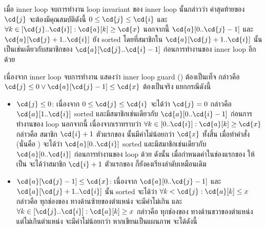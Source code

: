 \begin{example}
\begin{itemize}
เมื่อ inner loop จบการทำงาน loop invariant ของ inner loop นั้นกล่าวว่า ค่าสุดท้ายของ $\cd{j}$ จะต้องมีคุณสมบัติดังนี้ $0\leq\cd{j}\leq\cd{i}$ และ $\forall k\in[\cd{j}..\cd{i}]: \cd{a}[k]\geq\cd{x}$ \enskip นอกจากนี้ $\cd{a}[0..\cd{j}-1]$ และ $\cd{a}[\cd{j}+1..\cd{i}]$ ยัง sorted โดยที่สมาชิกใน $\cd{a}[\cd{j}+1..\cd{i}]$ นั้นเป็นเช่นเดียวกับสมาชิกของ $\cd{a}[\cd{j}..\cd{i}-1]$ ก่อนการทำงานของ inner loop อีกด้วย

เนื่องจาก inner loop จบการทำงาน แสดงว่า inner loop guard () ต้องเป็นเท็จ กล่าวคือ $\cd{j}\leq 0\vee\cd{a}[\cd{j}-1]\leq\cd{x}$ ต้องเป็นจริง \enskip แยกกรณีดังนี้
\begin{itemize}
\item $\cd{j}\leq 0$: เนื่องจาก $0\leq\cd{j}\leq\cd{i}$ จะได้ว่า $\cd{j}=0$ กล่าวคือ $\cd{a}[1..\cd{i}]$ sorted และมีสมาชิกเช่นเดียวกับ $\cd{a}[0..\cd{i}-1]$ ก่อนการทำงานของ loop \enskip นอกจากนี้ เนื่องจากเราทราบว่า $\forall k\in[0..\cd{i}]: \cd{a}[k]\geq\cd{x}$ กล่าวคือ สมาชิก $\cd{i}+1$ ตัวแรกของ  นั้นมีค่าไม่น้อยกว่า $\cd{x}$ ทั้งสิ้น เมื่อทำคำสั่ง  (นั่นคือ ) จะได้ว่า $\cd{a}[0..\cd{i}]$ sorted และมีสมาชิกเช่นเดียวกับ $\cd{a}[0..\cd{i}]$ ก่อนการทำงานของ loop ด้วย \enskip ดังนั้น เมื่อกำหนดค่าในช่องแรกของ  ให้เป็น  จะได้ว่าสมาชิก $\cd{i}+1$ ตัวแรกของ  ก็ยังคงเรียงลำดับเหมือนเดิม

\item $\cd{a}[\cd{j}-1]\leq\cd{x}$: เนื่องจาก $\cd{a}[0..\cd{j}-1]$ และ $\cd{a}[\cd{j}+1..\cd{i}]$ นั้น sorted จะได้ว่า $\forall k<\cd{j}: \cd{a}[k]\leq x$ กล่าวคือ ทุกช่องของ  ทางด้านซ้ายของตำแหน่ง     จะมีค่าไม่เกิน  และ $\forall k\in[\cd{j}..\cd{i}]: \cd{a}[k]\geq x$ กล่าวคือ ทุกช่องของ  ทางด้านขวาของตำแหน่ง  แต่ไม่เกินตำแหน่ง  จะมีค่าไม่น้อยกว่า  \enskip หากเขียนเป็นแผนภาพ จะได้ดังนี้
\begin{center}
\end{center}
\end{itemize}
\end{itemize}
\end{example}
